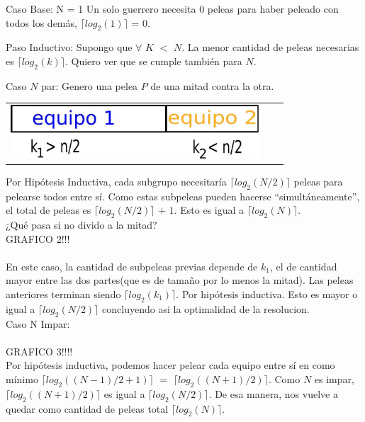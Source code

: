         Caso Base: N = 1
        Un solo guerrero necesita $0$ peleas para haber peleado con todos los demás, $\lceil log_{2}(1) \rceil$ = $0$.

        Paso Inductivo: Supongo que $\forall$ $K$ $<$ $N$. La menor cantidad de peleas necesarias es $\lceil log_{2}(k) \rceil$. Quiero ver que se cumple también para $N$.

        Caso $N$ par:
        Genero una pelea $P$ de una mitad contra la otra. 

        {\begin{tabular}{ccc}
         \includegraphics[height=2cm]{graficos/kaioken-desarrollo-1.jpg} 

          \end{tabular}}

        Por Hipótesis Inductiva, cada subgrupo necesitaría $\lceil log_{2}(N/2) \rceil$ peleas para pelearse todos entre sí. Como estas subpeleas pueden hacerse “simultáneamente”, el total de peleas es $\lceil log_{2}(N/2) \rceil$ $+$ $1$. Esto es igual a $\lceil log_{2}(N) \rceil$. \\

        ¿Qué pasa si no divido a la mitad?\\


        GRAFICO 2!!!\\
        \\

        En este caso, la cantidad de subpeleas previas depende de $k_{1}$, el de cantidad mayor entre las dos partes(que es de tamaño por lo menos la mitad). Las peleas anteriores terminan siendo $\lceil log_{2}(k_{1}) \rceil$. Por hipótesis inductiva. Esto es mayor o igual a $\lceil log_{2}(N/2) \rceil$ concluyendo asi la optimalidad de la resolucion. \\

        Caso N Impar: \\
        \\

        GRAFICO 3!!!!
        \\

        Por hipótesis inductiva, podemos hacer pelear cada equipo entre sí en como mínimo $\lceil log_{2}((N-1)/2+1) \rceil$ $=$ $\lceil log_{2}((N+1)/2) \rceil$. Como $N$ es impar, $\lceil log_{2}((N+1)/2) \rceil$ es igual a $\lceil log_{2}(N/2) \rceil$. De esa manera, nos vuelve a quedar como cantidad de peleas total $\lceil log_{2}(N) \rceil$. \\

